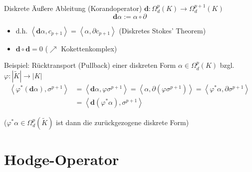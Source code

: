 \documentclass{beamer}
\renewcommand{\d}{\textbf{d}}
\begin{document}
  \begin{frame}
    \begin{block}{Diskrete Äußere Ableitung (Korandoperator) \( \d: \Omega_{d}^{p}(K) \longrightarrow \Omega_{d}^{p+1}(K) \)}
      \[ \d\alpha := \alpha\circ\partial \]
      \begin{itemize}
        \item d.h. \( \left\langle \d\alpha , c_{p+1} \right\rangle =  \left\langle \alpha , \partial c_{p+1} \right\rangle\) 
              \qquad(Diskretes Stokes' Theorem)
        \item \( \d\circ\d = 0 \) \qquad(\( \nearrow \) Kokettenkomplex)
      \end{itemize}
    \end{block}
    \begin{block}{Beispiel: Rücktransport (Pullback) einer diskreten Form \( \alpha\in\Omega_{d}^{p}(K)\) bzgl. \( \varphi:|\tilde{K}|\rightarrow |K| \)}
      \begin{align*}
        \left\langle \varphi^{*}(\d \alpha) , \sigma^{p+1} \right\rangle &= \left\langle \d \alpha , \varphi\sigma^{p+1} \right\rangle
                                                                          = \left\langle \alpha , \partial(\varphi\sigma^{p+1}) \right\rangle
                                                                          =  \left\langle \varphi^{*}\alpha , \partial\sigma^{p+1} \right\rangle \\
                                                                         &= \left\langle \d(\varphi^{*}\alpha) , \sigma^{p+1} \right\rangle
      \end{align*}
    \end{block}
    (\( \varphi^{*}\alpha \in \Omega_{d}^{p}(\tilde{K}) \) ist dann die zurückgezogene diskrete Form)
  \end{frame}




  \section{Hodge-Operator}
\end{document}
